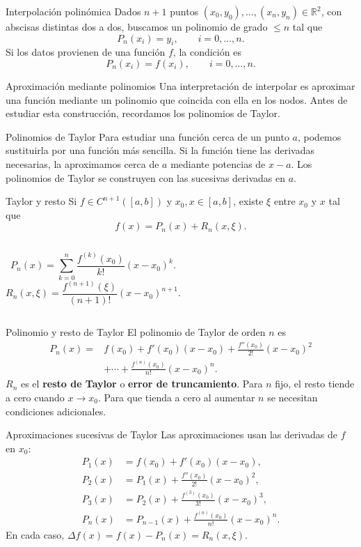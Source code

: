 \documentclass[main.tex]{subfiles}
\begin{document}
\begin{frame}[t]{Interpolación polinómica}
\small
Dados $n+1$ puntos $(x_0,y_0),\ldots,(x_n,y_n)\in\mathbb{R}^2$, con abscisas distintas dos a dos, buscamos un polinomio de grado $\le n$ tal que
\[P_n(x_i)=y_i,\qquad i=0,\ldots,n.\]
Si los datos provienen de una función $f$, la condición es
\[P_n(x_i)=f(x_i),\qquad i=0,\ldots,n.\]
\end{frame}
\begin{frame}[t]{Aproximación mediante polinomios}
Una interpretación de interpolar es aproximar una función mediante un polinomio que coincida con ella en los nodos.
\bigskip
Antes de estudiar esta construcción, recordamos los polinomios de Taylor.
\end{frame}
\begin{frame}[t]{Polinomios de Taylor}
Para estudiar una función cerca de un punto $a$, podemos sustituirla por una función más sencilla.
\bigskip
Si la función tiene las derivadas necesarias, la aproximamos cerca de $a$ mediante potencias de $x-a$.
\bigskip
Los polinomios de Taylor se construyen con las sucesivas derivadas en $a$.
\end{frame}
\begin{frame}[t]{Taylor y resto}
\small Si $f\in C^{n+1}([a,b])$ y $x_0,x\in[a,b]$, existe $\xi$ entre $x_0$ y $x$ tal que
\[f(x)=P_n(x)+R_n(x,\xi).\]
\begin{columns}
\[P_n(x)=\sum_{k=0}^n\frac{f^{(k)}(x_0)}{k!}(x-x_0)^k.\]
\[R_n(x,\xi)=\frac{f^{(n+1)}(\xi)}{(n+1)!}(x-x_0)^{n+1}.\]
\end{columns}
\end{frame}
\begin{frame}[t]{Polinomio y resto de Taylor}
\small El polinomio de Taylor de orden $n$ es
\begin{align*}
P_n(x)={}&f(x_0)+f'(x_0)(x-x_0)+\frac{f''(x_0)}{2!}(x-x_0)^2\\
&+\cdots+\frac{f^{(n)}(x_0)}{n!}(x-x_0)^n.
\end{align*}
$R_n$ es el \textbf{resto de Taylor} o \textbf{error de truncamiento}.
\medskip
Para $n$ fijo, el resto tiende a cero cuando $x\to x_0$. Para que tienda a cero al aumentar $n$ se necesitan condiciones adicionales.
\end{frame}
\begin{frame}[t]{Aproximaciones sucesivas de Taylor}
\small
Las aproximaciones usan las derivadas de $f$ en $x_0$:
\begin{align*}
P_1(x)&=f(x_0)+f'(x_0)(x-x_0),\\
P_2(x)&=P_1(x)+\frac{f''(x_0)}{2!}(x-x_0)^2,\\
P_3(x)&=P_2(x)+\frac{f^{(3)}(x_0)}{3!}(x-x_0)^3,\\
P_n(x)&=P_{n-1}(x)+\frac{f^{(n)}(x_0)}{n!}(x-x_0)^n.
\end{align*}
En cada caso, $\Delta f(x)=f(x)-P_n(x)=R_n(x,\xi)$.
\end{frame}
\end{document}
